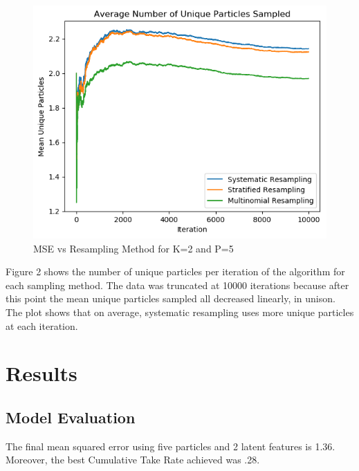 \documentclass{article}
\begin{document}
\begin{figure}[ht]
\begin{center}
\centerline{\includegraphics[width=\columnwidth]{num_unique_particles_when_resampling_k=2_np=10.png}}
\caption{MSE vs Resampling Method for K=2 and P=5}
\label{MSEResampling}
\end{center}
\vskip -0.4in
\end{figure}

Figure 2 shows the number of unique particles per iteration of the algorithm for each sampling method. The data was truncated at 10000 iterations because after this point the mean unique particles sampled all decreased linearly, in unison. The plot shows that on average, systematic resampling uses more unique particles at each iteration. 

\section{Results}

\subsection{Model Evaluation}

The final mean squared error using five particles and 2 latent features is 1.36. Moreover, the best Cumulative Take Rate achieved was .28.
\end{document}
